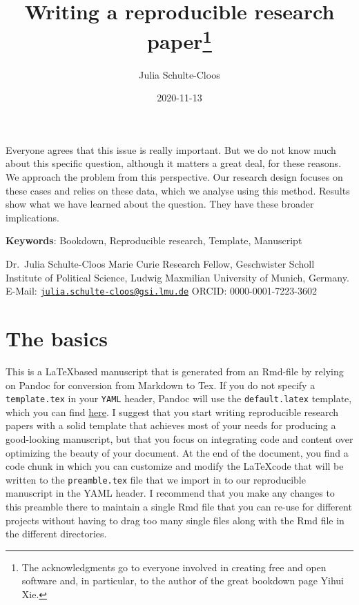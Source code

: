 \documentclass[
  11pt,
]{scrartcl}
\title{Writing a reproducible research paper\thanks{The acknowledgments go to everyone involved in creating free and open software and, in particular, to the author of the great bookdown page Yihui Xie.}}
\author{Julia Schulte-Cloos}
\date{2020-11-13}
\renewenvironment{abstract}
 {\vfill
  \begin{center}
  \bfseries \abstractname\vspace{-.5em}\vspace{0pt}
  \end{center}
  \list{}{
    \setlength{\leftmargin}{2cm}%
    \setlength{\rightmargin}{\leftmargin}%
  }%
  \item\relax}
 {\endlist}
\begin{document}
\maketitle
\begin{abstract}
Everyone agrees that this issue is really important. But we do not know much about this specific question, although it matters a great deal, for these reasons. We approach the problem from this perspective. Our research design focuses on these cases and relies on these data, which we analyse using this method. Results show what we have learned about the question. They have these broader implications.

\textbf{Keywords}: Bookdown, Reproducible research, Template, Manuscript

Dr.~Julia Schulte-Cloos
Marie Curie Research Fellow, Geschwister Scholl Institute of Political Science, Ludwig Maxmilian University of Munich, Germany.
E-Mail: \href{mailto:julia.schulte-cloos@gsi.lmu.de}{\nolinkurl{julia.schulte-cloos@gsi.lmu.de}}
ORCID: 0000-0001-7223-3602
\end{abstract}


\thispagestyle{empty}
\setcounter{page}{0}


\newpage

\hypertarget{the-basics}{%
\section{The basics}\label{the-basics}}

This is a \LaTeX based manuscript that is generated from an Rmd-file by relying on Pandoc for conversion from Markdown to Tex. If you do not specify a \texttt{template.tex} in your \texttt{YAML} header, Pandoc will use the \texttt{default.latex} template, which you can find \href{https://github.com/jgm/pandoc-templates/blob/master/default.latex}{here}. I suggest that you start writing reproducible research papers with a solid template that achieves most of your needs for producing a good-looking manuscript, but that you focus on integrating code and content over optimizing the beauty of your document. At the end of the document, you find a code chunk in which you can customize and modify the \LaTeX code that will be written to the \texttt{preamble.tex} file that we import in to our reproducible manuscript in the YAML header. I recommend that you make any changes to this preamble there to maintain a single Rmd file that you can re-use for different projects without having to drag too many single files along with the Rmd file in the different directories.
\end{document}
